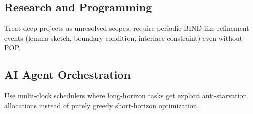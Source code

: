 \documentclass[11pt]{article}
\begin{document}
\subsection*{Research and Programming}
Treat deep projects as unresolved scopes; require periodic BIND-like refinement events
(lemma sketch, boundary condition, interface constraint) even without POP.

\subsection*{AI Agent Orchestration}
Use multi-clock schedulers where long-horizon tasks get explicit anti-starvation allocations
instead of purely greedy short-horizon optimization.
\end{document}

